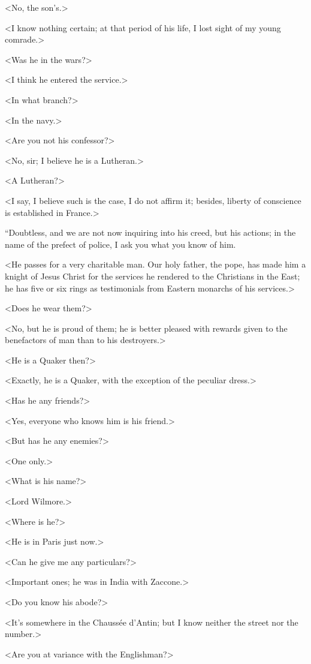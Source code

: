  <No, the son's.> 

 <I know nothing certain; at that period of his life, I lost sight of my young comrade.> 

 <Was he in the wars?> 

 <I think he entered the service.> 

 <In what branch?> 

 <In the navy.> 

 <Are you not his confessor?> 

 <No, sir; I believe he is a Lutheran.> 

 <A Lutheran?> 

 <I say, I believe such is the case, I do not affirm it; besides, liberty of conscience is established in France.> 

 “Doubtless, and we are not now inquiring into his creed, but his actions; in the name of the prefect of police, I ask you what you know of him. 

 <He passes for a very charitable man. Our holy father, the pope, has made him a knight of Jesus Christ for the services he rendered to the Christians in the East; he has five or six rings as testimonials from Eastern monarchs of his services.> 

 <Does he wear them?> 

 <No, but he is proud of them; he is better pleased with rewards given to the benefactors of man than to his destroyers.> 

 <He is a Quaker then?> 

 <Exactly, he is a Quaker, with the exception of the peculiar dress.> 

 <Has he any friends?> 

 <Yes, everyone who knows him is his friend.> 

 <But has he any enemies?> 

 <One only.> 

 <What is his name?> 

 <Lord Wilmore.> 

 <Where is he?> 

 <He is in Paris just now.> 

 <Can he give me any particulars?> 

 <Important ones; he was in India with Zaccone.> 

 <Do you know his abode?> 

 <It's somewhere in the Chaussée d'Antin; but I know neither the street nor the number.>

<Are you at variance with the Englishman?> 

